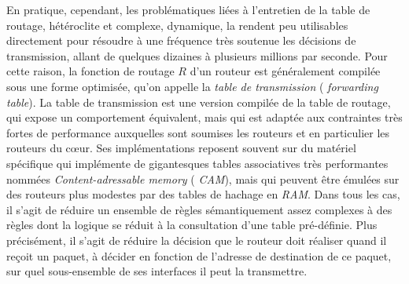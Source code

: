 En pratique, cependant, les problématiques liées à l'entretien de la table de
routage, hétéroclite et complexe, dynamique, la rendent peu utilisables
directement pour résoudre à une fréquence très soutenue les décisions de
transmission, allant de quelques dizaines à plusieurs millions par seconde. Pour
cette raison, la fonction de routage $R$ d'un routeur est généralement compilée
sous une forme optimisée, qu'on appelle la {\em table de transmission} ({\em
forwarding table}). La table de transmission est une version compilée de la
table de routage, qui expose un comportement équivalent, mais qui est adaptée
aux contraintes très fortes de performance auxquelles sont soumises les routeurs
et en particulier les routeurs du c\oe{}ur. Ses implémentations reposent
souvent sur du matériel spécifique qui implémente de gigantesques tables
associatives très performantes nommées {\em Content-adressable memory} ({\em
CAM}), mais qui peuvent être émulées sur des routeurs plus modestes par des
tables de hachage en {\em RAM}. Dans tous les cas, il s'agit de réduire un
ensemble de règles sémantiquement assez complexes à des règles dont la logique
se réduit à la consultation d'une table pré-définie. Plus précisément, il s'agit
de réduire la décision que le routeur doit réaliser quand il reçoit un paquet, à
décider en fonction de l'adresse de destination de ce paquet, sur quel
sous-ensemble de ses interfaces il peut la transmettre.

